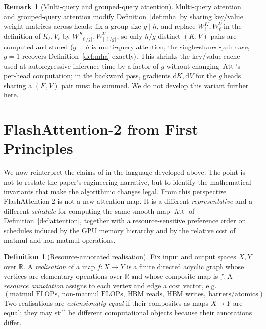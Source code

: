 \documentclass[11pt]{amsart}
\theoremstyle{plain}
\theoremstyle{definition}
\newtheorem{definition}[theorem]{Definition}
\newtheorem{remark}[theorem]{Remark}
\newcommand{\R}{\mathbb{R}}
\newcommand{\Att}{\operatorname{Att}}
\begin{document}
\begin{remark}[Multi-query and grouped-query attention]
Multi-query attention \cite{shazeer2019fast} and grouped-query attention
\cite{ainslie2023gqa} modify Definition~\ref{def:mha} by sharing key/value
weight matrices across heads: fix a group size $g \mid h$, and replace
$W^K_\ell, W^V_\ell$ in the definition of $K_\ell, V_\ell$ by
$W^K_{\lceil \ell/g\rceil}, W^V_{\lceil \ell/g\rceil}$, so only $h/g$
distinct $(K,V)$ pairs are computed and stored ($g=h$ is multi-query
attention, the single-shared-pair case; $g=1$ recovers
Definition~\ref{def:mha} exactly).  This shrinks the key/value cache used
at autoregressive inference time by a factor of $g$ without changing
$\Att$'s per-head computation; in the backward pass, gradients
$\mathrm{d}K,\mathrm{d}V$ for the $g$ heads sharing a $(K,V)$ pair must be
summed.  We do not develop this variant further here.
\end{remark}

\section{FlashAttention-2 from First Principles}
\label{sec:flash2-first-principles}

We now reinterpret the claims of \cite{Dao2023} in the language developed
above.  The point is not to restate the paper's engineering narrative, but to
identify the mathematical invariants that make the algorithmic changes legal.
From this perspective FlashAttention-2 is not a new attention map.  It is a
different \emph{representative} and a different \emph{schedule} for computing
the same smooth map $\Att$ of Definition~\ref{def:attention}, together with a
resource-sensitive preference order on schedules induced by the GPU memory
hierarchy and by the relative cost of matmul and non-matmul operations.

\begin{definition}[Resource-annotated realisation]
\label{def:resource-realisation}
Fix input and output spaces $X,Y$ over $\R$.  A \emph{realisation} of a map
$f : X \to Y$ is a finite directed acyclic graph whose vertices are elementary
operations over $\R$ and whose composite map is $f$.  A \emph{resource
annotation} assigns to each vertex and edge a cost vector, e.g.
\[
    (\text{matmul FLOPs},\ \text{non-matmul FLOPs},\
      \text{HBM reads},\ \text{HBM writes},\ \text{barriers/atomics}).
\]
Two realisations are \emph{extensionally equal} if their composites as maps
$X \to Y$ are equal; they may still be different computational objects because
their annotations differ.
\end{definition}
\end{document}
